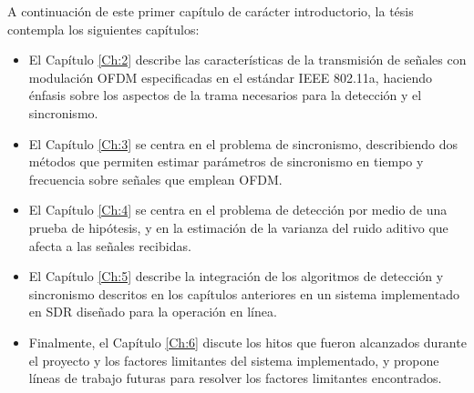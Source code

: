 A continuación de este primer capítulo de carácter introductorio, la tésis contempla los siguientes capítulos:
\begin{itemize}
    \item El Capítulo \ref{Ch:2} describe las características de la transmisión de señales \color{Red}con modulación OFDM \color{black} especificadas en el estándar IEEE 802.11a, haciendo énfasis sobre los aspectos de la trama necesarios para la detección y el sincronismo.
    \item El Capítulo \ref{Ch:3} se centra en el problema de sincronismo, describiendo dos métodos que permiten estimar parámetros de sincronismo en tiempo y frecuencia sobre señales que emplean OFDM.
    \item El Capítulo \ref{Ch:4} se centra en el problema de detección por medio de una prueba de hipótesis, y en la estimación de la varianza del ruido aditivo que afecta a las señales recibidas.
    \item El Capítulo \ref{Ch:5} describe la integración de los algoritmos de detección y sincronismo descritos en los capítulos anteriores en un sistema implementado en SDR diseñado para la operación en línea.
    \item Finalmente, el Capítulo \ref{Ch:6} discute los hitos que fueron alcanzados durante el proyecto y los factores limitantes del sistema implementado, y propone líneas de trabajo futuras para resolver los factores limitantes encontrados.
\end{itemize}

